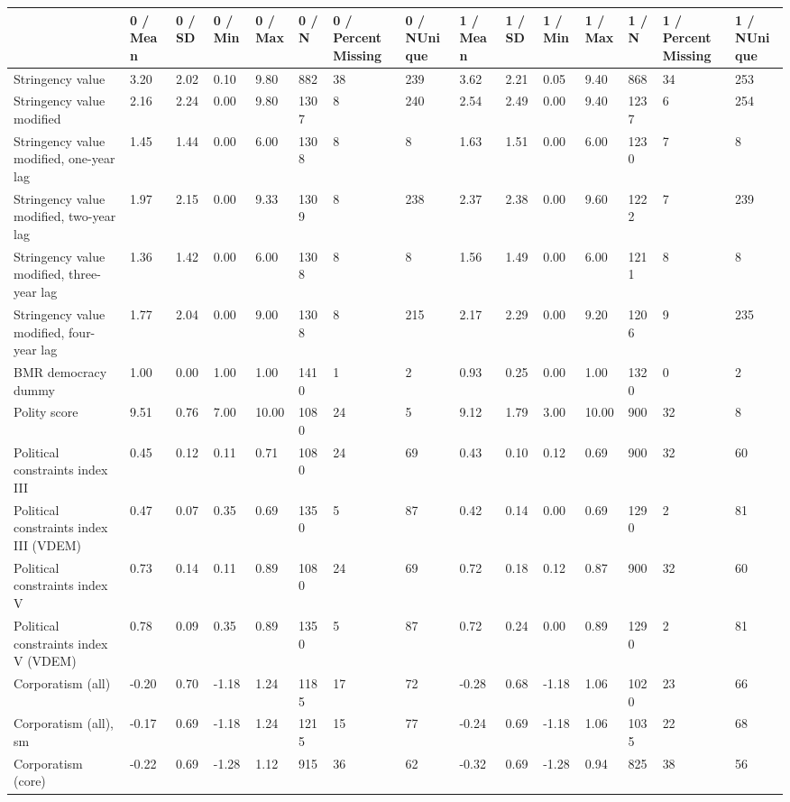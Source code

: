 
\begin{longtable}{lllllllllllllll}
\toprule
  & 0 / Mean & 0 / SD & 0 / Min & 0 / Max & 0 / N & 0 / PercentMissing & 0 / NUnique & 1 / Mean & 1 / SD & 1 / Min & 1 / Max & 1 / N & 1 / PercentMissing & 1 / NUnique\\
\midrule
Stringency value & 3.20 & 2.02 & 0.10 & 9.80 & 882 & 38 & 239 & 3.62 & 2.21 & 0.05 & 9.40 & 868 & 34 & 253\\
Stringency value modified & 2.16 & 2.24 & 0.00 & 9.80 & 1307 & 8 & 240 & 2.54 & 2.49 & 0.00 & 9.40 & 1237 & 6 & 254\\
Stringency value modified, one-year lag & 1.45 & 1.44 & 0.00 & 6.00 & 1308 & 8 & 8 & 1.63 & 1.51 & 0.00 & 6.00 & 1230 & 7 & 8\\
Stringency value modified, two-year lag & 1.97 & 2.15 & 0.00 & 9.33 & 1309 & 8 & 238 & 2.37 & 2.38 & 0.00 & 9.60 & 1222 & 7 & 239\\
Stringency value modified, three-year lag & 1.36 & 1.42 & 0.00 & 6.00 & 1308 & 8 & 8 & 1.56 & 1.49 & 0.00 & 6.00 & 1211 & 8 & 8\\
\addlinespace
Stringency value modified, four-year lag & 1.77 & 2.04 & 0.00 & 9.00 & 1308 & 8 & 215 & 2.17 & 2.29 & 0.00 & 9.20 & 1206 & 9 & 235\\
BMR democracy dummy & 1.00 & 0.00 & 1.00 & 1.00 & 1410 & 1 & 2 & 0.93 & 0.25 & 0.00 & 1.00 & 1320 & 0 & 2\\
Polity score & 9.51 & 0.76 & 7.00 & 10.00 & 1080 & 24 & 5 & 9.12 & 1.79 & 3.00 & 10.00 & 900 & 32 & 8\\
Political constraints index III & 0.45 & 0.12 & 0.11 & 0.71 & 1080 & 24 & 69 & 0.43 & 0.10 & 0.12 & 0.69 & 900 & 32 & 60\\
Political constraints index III (VDEM) & 0.47 & 0.07 & 0.35 & 0.69 & 1350 & 5 & 87 & 0.42 & 0.14 & 0.00 & 0.69 & 1290 & 2 & 81\\
\addlinespace
Political constraints index V & 0.73 & 0.14 & 0.11 & 0.89 & 1080 & 24 & 69 & 0.72 & 0.18 & 0.12 & 0.87 & 900 & 32 & 60\\
Political constraints index V (VDEM) & 0.78 & 0.09 & 0.35 & 0.89 & 1350 & 5 & 87 & 0.72 & 0.24 & 0.00 & 0.89 & 1290 & 2 & 81\\
Corporatism (all) & -0.20 & 0.70 & -1.18 & 1.24 & 1185 & 17 & 72 & -0.28 & 0.68 & -1.18 & 1.06 & 1020 & 23 & 66\\
Corporatism (all), sm & -0.17 & 0.69 & -1.18 & 1.24 & 1215 & 15 & 77 & -0.24 & 0.69 & -1.18 & 1.06 & 1035 & 22 & 68\\
Corporatism (core) & -0.22 & 0.69 & -1.28 & 1.12 & 915 & 36 & 62 & -0.32 & 0.69 & -1.28 & 0.94 & 825 & 38 & 56\\

\end{longtable}
